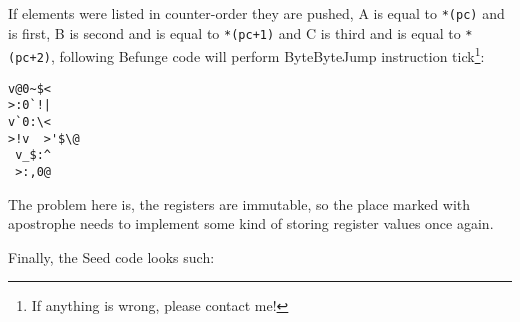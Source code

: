 \documentclass{article}
\begin{document}
\par If elements were listed in counter-order they are pushed, A is equal to \verb|*(pc)| and is first, B is second and is equal to \verb|*(pc+1)| and C is third and is equal to \verb|*(pc+2)|, following Befunge code will perform ByteByteJump instruction tick\footnote{If anything is wrong, please contact me!}:

\begin{verbatim}
v@0~$<
>:0`!|
v`0:\<
>!v  >'$\@
 v_$:^
 >:,0@
\end{verbatim}

\par The problem here is, the registers are immutable, so the place marked with apostrophe needs to implement some kind of storing register values once again.

\par Finally, the Seed code looks such:
\end{document}
